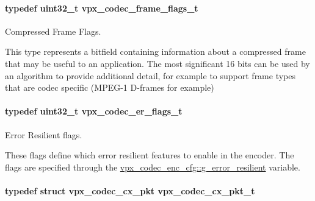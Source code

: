 \paragraph[{\texorpdfstring{vpx\+\_\+codec\+\_\+frame\+\_\+flags\+\_\+t}{vpx_codec_frame_flags_t}}]{\setlength{\rightskip}{0pt plus 5cm}typedef uint32\+\_\+t {\bf vpx\+\_\+codec\+\_\+frame\+\_\+flags\+\_\+t}}\hypertarget{group__encoder_gaac8ee319b9a6175f6946f59437c7ae4b}{}\label{group__encoder_gaac8ee319b9a6175f6946f59437c7ae4b}


Compressed Frame Flags. 

This type represents a bitfield containing information about a compressed frame that may be useful to an application. The most significant 16 bits can be used by an algorithm to provide additional detail, for example to support frame types that are codec specific (M\+P\+E\+G-\/1 D-\/frames for example) 
\paragraph[{\texorpdfstring{vpx\+\_\+codec\+\_\+er\+\_\+flags\+\_\+t}{vpx_codec_er_flags_t}}]{\setlength{\rightskip}{0pt plus 5cm}typedef uint32\+\_\+t {\bf vpx\+\_\+codec\+\_\+er\+\_\+flags\+\_\+t}}\hypertarget{group__encoder_ga77e0e1fff62556a4f4d54c84467a41f3}{}\label{group__encoder_ga77e0e1fff62556a4f4d54c84467a41f3}


Error Resilient flags. 

These flags define which error resilient features to enable in the encoder. The flags are specified through the \hyperlink{structvpx__codec__enc__cfg_a4e17173b66ca0d7dfba9978625d7ba76}{vpx\+\_\+codec\+\_\+enc\+\_\+cfg\+::g\+\_\+error\+\_\+resilient} variable. 
\paragraph[{\texorpdfstring{vpx\+\_\+codec\+\_\+cx\+\_\+pkt\+\_\+t}{vpx_codec_cx_pkt_t}}]{\setlength{\rightskip}{0pt plus 5cm}typedef struct {\bf vpx\+\_\+codec\+\_\+cx\+\_\+pkt}  {\bf vpx\+\_\+codec\+\_\+cx\+\_\+pkt\+\_\+t}}\hypertarget{group__encoder_ga3f711e17fbefac545e8959ef5a023556}{}\label{group__encoder_ga3f711e17fbefac545e8959ef5a023556}


